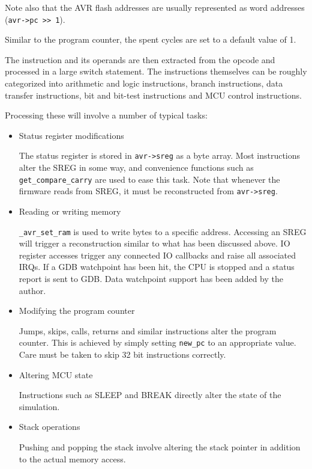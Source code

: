 Note also that the \ac{AVR} flash addresses are usually represented as word addresses
(\lstinline|avr->pc >> 1|).

Similar to the program counter, the spent cycles are set to a default value of 1.

The instruction and its operands are then extracted from the opcode and processed
in a large switch statement. The instructions themselves can be roughly categorized
into arithmetic and logic instructions, branch instructions, data transfer
instructions, bit and bit-test instructions and \ac{MCU} control instructions.

Processing these will involve a number of typical tasks:

\begin{itemize}
\item Status register modifications

The status register is stored in \lstinline|avr->sreg| as a byte array.
Most instructions alter the \ac{SREG} in some way, and convenience functions such as
\lstinline|get_compare_carry| are used to ease this task. Note that whenever the
firmware reads from \ac{SREG}, it must be reconstructed from \lstinline|avr->sreg|.

\item Reading or writing memory

\lstinline|_avr_set_ram| is used to write bytes to a specific address. Accessing
an \ac{SREG} will trigger a reconstruction similar to what has been discussed above.
\ac{IO} register accesses trigger any connected \ac{IO} callbacks and raise all associated
\acp{IRQ}. If a \ac{GDB} watchpoint has been hit, the \ac{CPU} is stopped and a status report
is sent to \ac{GDB}. Data watchpoint support has been added by the author.

\item Modifying the program counter

Jumps, skips, calls, returns and similar instructions alter the program counter.
This is achieved by simply setting \lstinline|new_pc| to an appropriate value. Care must be
taken to skip 32 bit instructions correctly.

\item Altering \ac{MCU} state

Instructions such as SLEEP and BREAK directly alter the state of the simulation.

\item Stack operations

Pushing and popping the stack involve altering the stack pointer in addition
to the actual memory access.
\end{itemize}

